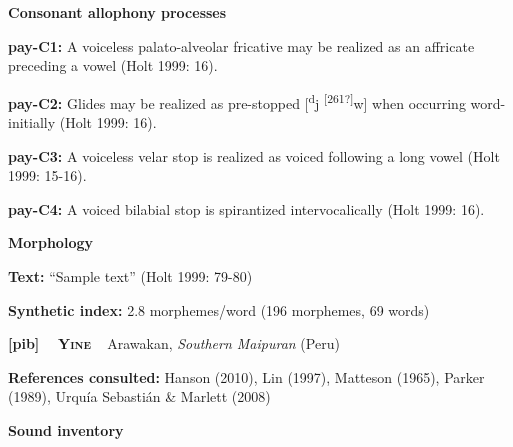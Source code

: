 \begin{styleBody}
\textbf{Consonant allophony processes}
\end{styleBody}

\begin{styleBody}
\textbf{pay-C1: }A voiceless palato-alveolar fricative may be realized as an affricate preceding a vowel (Holt 1999: 16).
\end{styleBody}

\begin{styleBody}
\textbf{pay-C2: }Glides may be realized as pre-stopped [\textsuperscript{d}j \textsuperscript{[261?]}w] when occurring word-initially (Holt 1999: 16).
\end{styleBody}

\begin{styleBody}
\textbf{pay-C3: }A voiceless velar stop is realized as voiced following a long vowel (Holt 1999: 15-16).
\end{styleBody}

\begin{styleBody}
\textbf{pay-C4: }A voiced bilabial stop is spirantized intervocalically (Holt 1999: 16).
\end{styleBody}

\begin{styleBody}
\textbf{Morphology}
\end{styleBody}

\begin{styleBody}
\textbf{Text:} “Sample text” (Holt 1999: 79-80)
\end{styleBody}

\begin{styleBody}
\textbf{Synthetic index: }2.8 morphemes/word (196 morphemes, 69 words)
\end{styleBody}

\clearpage\begin{styleBody}
\textbf{[pib] }\ \ \textbf{\textsc{Yine}}\textbf{\ \ }Arawakan, \textit{Southern Maipuran} (Peru)
\end{styleBody}

\begin{styleBody}
\textbf{References consulted: }Hanson (2010), Lin (1997), Matteson (1965), Parker (1989), Urquía Sebastián \& Marlett (2008)
\end{styleBody}

\begin{styleBody}
\textbf{Sound inventory}
\end{styleBody}

